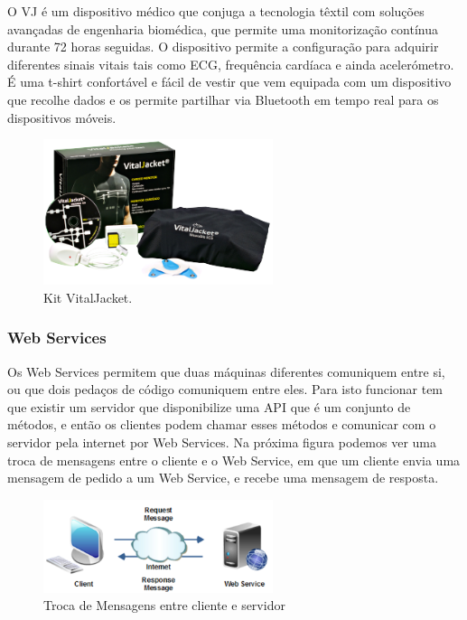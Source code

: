 O \gls{VJ} é um dispositivo médico que conjuga a tecnologia têxtil com soluções avançadas de engenharia biomédica, que permite uma monitorização contínua durante 72 horas seguidas. O dispositivo permite a configuração para adquirir diferentes sinais vitais tais como \gls{ECG}, frequência cardíaca e ainda acelerómetro. É uma t-shirt confortável e fácil de vestir que vem equipada com um dispositivo que recolhe dados e os permite partilhar via Bluetooth em tempo real para os dispositivos móveis. \cite{vj}

\begin{figure}[H]
  \centering
  \includegraphics[width=0.6\textwidth]{imgs/vj.png}
  \caption[Kit VitalJacket]{Kit VitalJacket. \cite{vj}}
  \label{f:vjkit}
\end{figure}

\subsubsection{Web Services}

Os Web Services permitem que duas máquinas diferentes comuniquem entre si, ou que dois pedaços de código comuniquem entre eles. Para isto funcionar tem que existir um servidor que disponibilize uma \gls{API} que é um conjunto de métodos, e então os clientes podem chamar esses métodos e comunicar com o servidor pela internet por Web Services. Na próxima figura podemos ver uma troca de mensagens entre o cliente e o Web Service, em que um cliente envia uma mensagem de pedido a um Web Service, e recebe uma mensagem de resposta.

\begin{figure}[H]
  \centering
  \includegraphics[width=0.6\textwidth]{imgs/wsscheme.png}
  \caption[Troca de Mensagens entre cliente e servidor]{Troca de Mensagens entre cliente e servidor \cite{wsjakob}}
  \label{f:wsscheme}
\end{figure}

